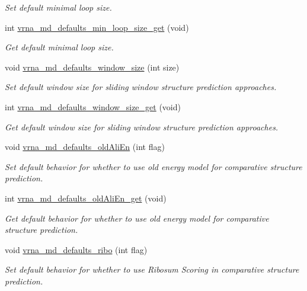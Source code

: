 \begin{DoxyCompactItemize}
\begin{DoxyCompactList}\small\item\em Set default minimal loop size. \end{DoxyCompactList}\item 
int \hyperlink{group__model__details_ga5cc691174a75c652807dc361b617632a}{vrna\+\_\+md\+\_\+defaults\+\_\+min\+\_\+loop\+\_\+size\+\_\+get} (void)
\begin{DoxyCompactList}\small\item\em Get default minimal loop size. \end{DoxyCompactList}\item 
void \hyperlink{group__model__details_ga7b802ce0e8c3181bf5cb580de6d5b26a}{vrna\+\_\+md\+\_\+defaults\+\_\+window\+\_\+size} (int size)
\begin{DoxyCompactList}\small\item\em Set default window size for sliding window structure prediction approaches. \end{DoxyCompactList}\item 
int \hyperlink{group__model__details_ga670146a9aa3ba77f4d422d60b7c30ac9}{vrna\+\_\+md\+\_\+defaults\+\_\+window\+\_\+size\+\_\+get} (void)
\begin{DoxyCompactList}\small\item\em Get default window size for sliding window structure prediction approaches. \end{DoxyCompactList}\item 
void \hyperlink{group__model__details_ga41521d5b9fb7e0f31e7ea73f5792afab}{vrna\+\_\+md\+\_\+defaults\+\_\+old\+Ali\+En} (int flag)
\begin{DoxyCompactList}\small\item\em Set default behavior for whether to use old energy model for comparative structure prediction. \end{DoxyCompactList}\item 
int \hyperlink{group__model__details_ga2374492b5019df88022fe4c05f0f3630}{vrna\+\_\+md\+\_\+defaults\+\_\+old\+Ali\+En\+\_\+get} (void)
\begin{DoxyCompactList}\small\item\em Get default behavior for whether to use old energy model for comparative structure prediction. \end{DoxyCompactList}\item 
void \hyperlink{group__model__details_ga937c45e1d06fd6168730a9b08d130be3}{vrna\+\_\+md\+\_\+defaults\+\_\+ribo} (int flag)
\begin{DoxyCompactList}\small\item\em Set default behavior for whether to use Ribosum Scoring in comparative structure prediction. \end{DoxyCompactList}\item 

\end{DoxyCompactItemize}
